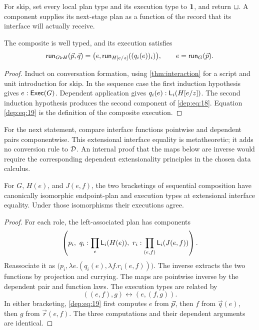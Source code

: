 For skip, set every local plan type and its execution type to $\mathbf 1$, and
return $\pointstar$. A component supplies its next-stage plan as a function of the
record that its interface will actually receive.

\begin{proposition}
\label{prop:sequence}
The composite is well typed, and its execution satisfies
\begin{equation}
 \mathsf{run}_{G\triangleright H}(\vec p,\vec q)
   =\bigl(e,\mathsf{run}_{H[e/z]}((q_i(e))_i)\bigr),
 \qquad e=\mathsf{run}_G(\vec p).
 \label{dep:eq:19}
\end{equation}
\end{proposition}
\begin{proof}
Induct on conversation formation, using \cref{thm:interaction} for a script
and unit introduction for skip. In the sequence case the first induction
hypothesis gives $e:\mathsf{Exec}(G)$. Dependent application gives
$q_i(e):\mathsf L_{i}(H[e/z])$. The second induction hypothesis produces the
second component of \eqref{dep:eq:18}. Equation \eqref{dep:eq:19} is the definition of the composite
execution.
\end{proof}

For the next statement, compare interface functions pointwise and dependent
pairs componentwise. This extensional interface equality is metatheoretic;
it adds no conversion rule to $\mathcal D$. An internal proof that the maps below are
inverse would require the corresponding dependent extensionality principles
in the chosen data calculus.

\begin{lemma}
\label{thm:associativity}
For $G$, $H(e)$, and $J(e,f)$, the two bracketings of sequential composition
have canonically isomorphic endpoint-plan and execution types at extensional
interface equality. Under those isomorphisms their executions agree.
\end{lemma}
\begin{proof}
For each role, the left-associated plan has components
\[
 \left(p_i,\ q_i:\prod_e\Local{i}{H(e)},\
                  r_i:\prod_{(e,f)}\Local{i}{J(e,f)}\right).
\]
Reassociate it as
$\bigl(p_i,\lambda e.(q_i(e),\lambda f.r_i(e,f))\bigr)$.
The inverse extracts the two functions by projection and currying. The maps
are pointwise inverse by the dependent pair and function laws. The execution types are
related by
\[
 ((e,f),g)\longleftrightarrow(e,(f,g)).
\]
In either bracketing, \eqref{dep:eq:19} first computes $e$ from $\vec p$, then $f$ from
$\vec q(e)$, then $g$ from $\vec r(e,f)$. The three computations and their
dependent arguments are identical.
\end{proof}

